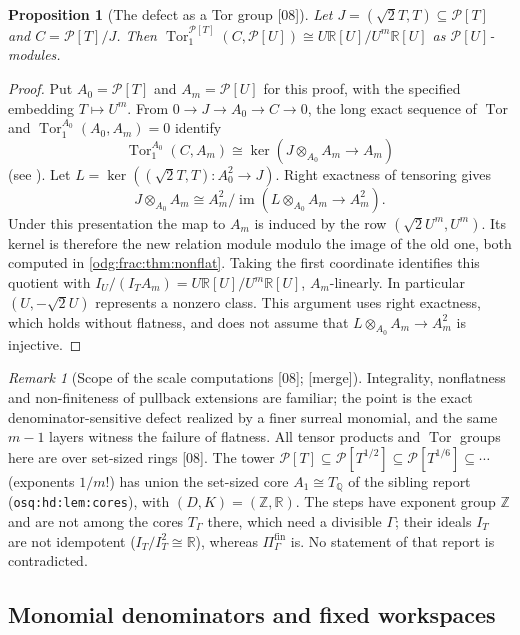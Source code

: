 \documentclass[11pt,oneside]{article}
\numberwithin{equation}{section}
\newtheorem{proposition}[proposition]{Proposition}
\theoremstyle{definition}
\theoremstyle{remark}
\newtheorem{remark}[remark]{Remark}
\newcommand{\Z}{\mathbb Z}
\newcommand{\Q}{\mathbb Q}
\newcommand{\R}{\mathbb R}
\newcommand{\src}[1]{\textup{\textsf{\small[#1]}}}
\newcommand{\mergetag}{\textup{\textsf{\small[merge]}}}
\newcommand{\replabel}[1]{\nolinkurl{#1}}
\newcommand{\Tor}{\operatorname{Tor}}
\newcommand{\Pmod}{\mathcal P}
\begin{document}
\begin{proposition}[The defect as a Tor group \src{08}]\label{odg:frac:prop:tor}
Let $J=(\sqrt2T,T)\subseteq\Pmod[T]$ and $C=\Pmod[T]/J$. Then
$\Tor_1^{\Pmod[T]}(C,\Pmod[U])\cong U\R[U]/U^m\R[U]$ as $\Pmod[U]$-modules.
\end{proposition}
\begin{proof}
Put $A_0=\Pmod[T]$ and $A_m=\Pmod[U]$ for this proof, with the specified
embedding $T\mapsto U^m$. From $0\to J\to A_0\to C\to0$, the long exact
sequence of $\Tor$ and $\Tor_1^{A_0}(A_0,A_m)=0$ identify
\[
 \Tor_1^{A_0}(C,A_m)
   \cong\ker(J\otimes_{A_0}A_m\longrightarrow A_m)
\]
(see \cite[Section 10.75]{StacksFlat}). Let
$L=\ker((\sqrt2T,T):A_0^2\to J)$. Right exactness of tensoring gives
\[
 J\otimes_{A_0}A_m\cong
 A_m^2/\operatorname{im}(L\otimes_{A_0}A_m\longrightarrow A_m^2).
\]
Under this presentation the map to $A_m$ is induced by the row
$(\sqrt2U^m,U^m)$. Its kernel is therefore the new relation module
modulo the image of the old one, both computed in
\cref{odg:frac:thm:nonflat}. Taking the first coordinate identifies this
quotient with $I_U/(I_TA_m)=U\R[U]/U^m\R[U]$, $A_m$-linearly.
In particular $(U,-\sqrt2U)$ represents a nonzero class. This argument
uses right exactness, which holds without flatness, and does not assume
that $L\otimes_{A_0}A_m\to A_m^2$ is injective.
\end{proof}

\begin{remark}[Scope of the scale computations \src{08}; \mergetag]\label{odg:frac:rem:cores}
Integrality, nonflatness and non-finiteness of pullback extensions are familiar;
the point is the exact denominator-sensitive defect realized by a finer surreal
monomial, and the same $m-1$ layers witness the failure of flatness. All tensor
products and $\Tor$ groups here are over set-sized rings \src{08}. The tower
$\Pmod[T]\subseteq\Pmod[T^{1/2}]\subseteq\Pmod[T^{1/6}]\subseteq\cdots$ (exponents
$1/m!$) has union the set-sized core $A_1\cong T_\Q$ of the sibling report
(\replabel{osq:hd:lem:cores}), with $(D,K)=(\Z,\R)$. The steps have exponent
group $\Z$ and are not among the cores $T_\Gamma$ there, which need a divisible
$\Gamma$; their ideals $I_T$ are not idempotent ($I_T/I_T^2\cong\R$), whereas
$\Pi^{\mathrm{fin}}_\Gamma$ is. No statement of that report is contradicted.
\end{remark}

\subsection{Monomial denominators and fixed workspaces}\label{odg:frac:sub:monomial}
\end{document}
